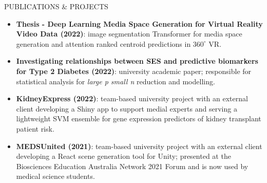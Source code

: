 
\begin{ResumeSection}{PUBLICATIONS \& PROJECTS}
    \begin{itemize}
        \item \textbf{Thesis - Deep Learning Media Space Generation for Virtual Reality Video Data (2022)}: image segmentation Transformer for media space generation and attention ranked centroid predictions in $360^\circ$ VR.\vspace{-0.25em}
        \item \textbf{Investigating relationships between SES and predictive biomarkers for Type 2 Diabetes (2022)}: university academic paper; responsible for statistical analysis for \textit{large p small n} reduction and modelling.\vspace{-0.25em}
        \item \textbf{KidneyExpress (2022)}: team-based university project with an external client developing a Shiny app to support medial experts and serving a lightweight SVM ensemble for gene expression predictors of kidney transplant patient risk.\vspace{-0.25em}
        \item \textbf{MEDSUnited (2021)}: team-based university project with an external client developing a React scene generation tool for Unity; presented at the Biosciences Education Australia Network 2021 Forum and is now used by medical science students.
    \end{itemize}
\end{ResumeSection} 